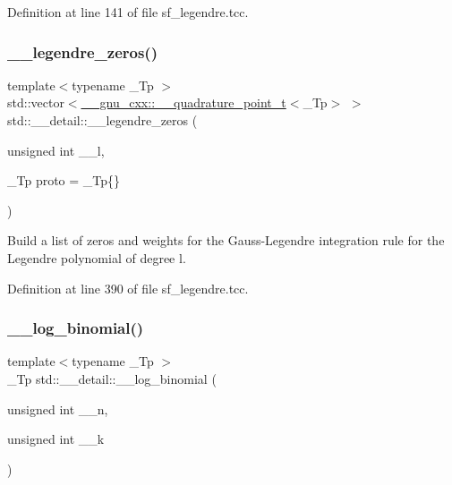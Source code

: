 Definition at line 141 of file sf\+\_\+legendre.\+tcc.

\mbox{\label{namespacestd_1_1____detail_a9d53ac0fd39232190e7564fa067a878d}} 
\subsubsection{\texorpdfstring{\+\_\+\+\_\+legendre\+\_\+zeros()}{\_\_legendre\_zeros()}}
{\footnotesize\ttfamily template$<$typename \+\_\+\+Tp $>$ \\
std\+::vector$<$\hyperlink{struct____gnu__cxx_1_1____quadrature__point__t}{\+\_\+\+\_\+gnu\+\_\+cxx\+::\+\_\+\+\_\+quadrature\+\_\+point\+\_\+t}$<$\+\_\+\+Tp$>$ $>$ std\+::\+\_\+\+\_\+detail\+::\+\_\+\+\_\+legendre\+\_\+zeros (\begin{DoxyParamCaption}\item[{unsigned int}]{\+\_\+\+\_\+l,  }\item[{\+\_\+\+Tp}]{proto = {\ttfamily \+\_\+Tp\{\}} }\end{DoxyParamCaption})}

Build a list of zeros and weights for the Gauss-\/\+Legendre integration rule for the Legendre polynomial of degree {\ttfamily l}. 

Definition at line 390 of file sf\+\_\+legendre.\+tcc.

\mbox{\label{namespacestd_1_1____detail_a087d65f98ba6a6709b4d62fa32445e59}} 
\subsubsection{\texorpdfstring{\+\_\+\+\_\+log\+\_\+binomial()}{\_\_log\_binomial()}\hspace{0.1cm}{\footnotesize\ttfamily [1/2]}}
{\footnotesize\ttfamily template$<$typename \+\_\+\+Tp $>$ \\
\+\_\+\+Tp std\+::\+\_\+\+\_\+detail\+::\+\_\+\+\_\+log\+\_\+binomial (\begin{DoxyParamCaption}\item[{unsigned int}]{\+\_\+\+\_\+n,  }\item[{unsigned int}]{\+\_\+\+\_\+k }\end{DoxyParamCaption})}



